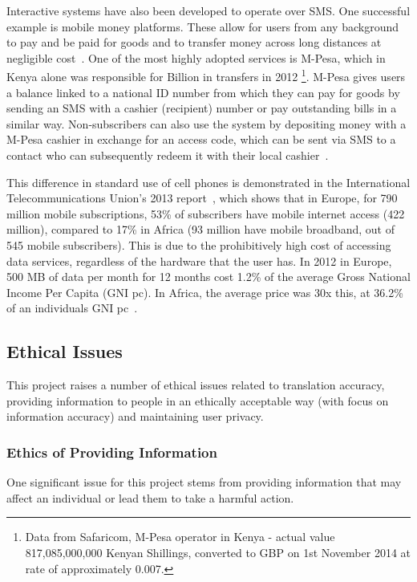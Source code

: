 \documentclass{article}
\begin{document}
Interactive systems have also been developed to operate over SMS.  One successful example is mobile money platforms.  These allow for users from any background to pay and be paid for goods and to transfer money across long distances at negligible cost~\cite{Aker_Mobile_Phones_2010}.  One of the most highly adopted services is M-Pesa, which in Kenya alone was responsible for  Billion in transfers in 2012 \footnote{Data from Safaricom, M-Pesa operator in Kenya - actual value 817,085,000,000 Kenyan Shillings, converted to GBP on 1st November 2014 at rate of approximately 0.007.}.  M-Pesa gives users a balance linked to a national ID number from which they can pay for goods by sending an SMS with a cashier (recipient) number or pay outstanding bills in a similar way.  Non-subscribers can also use the system by depositing money with a M-Pesa cashier in exchange for an access code, which can be sent via SMS to a contact who can subsequently redeem it with their local cashier~\cite{Aker_Mobile_Phones_2010}.

This difference in standard use of cell phones is demonstrated in the International Telecommunications Union's 2013 report~\cite{ITU_Cell_Usage_2013}, which shows that in Europe, for 790 million mobile subscriptions, 53\% of subscribers have mobile internet access (422 million), compared to 17\% in Africa (93 million have mobile broadband, out of 545 mobile subscribers).  This is due to the prohibitively high cost of accessing data services, regardless of the hardware that the user has.  In 2012 in Europe, 500 MB of data per month for 12 months cost 1.2\% of the average Gross National Income Per Capita (GNI pc).  In Africa, the average price was 30x this, at 36.2\% of an individuals GNI pc~\cite{ITU_Information_Society_2013}.


\subsection{Ethical Issues}
This project raises a number of ethical issues related to translation accuracy, providing information to people in an ethically acceptable way (with focus on information accuracy) and maintaining user privacy.

\subsubsection{Ethics of Providing Information}
One significant issue for this project stems from providing information that may affect an individual or lead them to take a harmful action.
\end{document}
